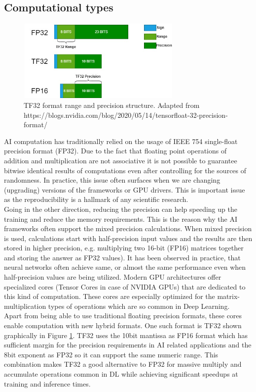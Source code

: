 \documentclass{article}
\begin{document}
\subsection{Computational types}
\begin{figure}[t!]
    \centering
    \includegraphics[width=8cm,height=4cm]{tf32.jpg}
    \caption{TF32 format range and precision structure. Adapted from  \\  https://blogs.nvidia.com/blog/2020/05/14/tensorfloat-32-precision-format/}
    \label{fig:tf32}
\end{figure}
AI computation has traditionally relied on the usage of IEEE 754 single-float precision format (FP32).
Due to the fact that floating point operations of addition and multiplication are not associative it is not possible to guarantee bitwise identical results of computations even after controlling for the sources of randomness.
In practice, this issue often surfaces when we are changing (upgrading) versions of the frameworks or GPU drivers.
This is important issue as the reproducibility is a hallmark of any scientific research.\\
Going in the other direction, reducing the precision can help speeding up the training and reduce the memory requirements.
This is the reason why the AI frameworks often support the mixed precision calculations.
When mixed precision is used, calculations start with half-precision input values and the results are then stored in higher precision, e.g. multiplying two 16-bit (FP16) matrices together and storing the answer as FP32 values).
It has been observed in practice, that neural networks often achieve same, or almost the same performance even when half-precision values are being utilized.
Modern GPU architectures offer specialized cores (Tensor Cores in case of NVIDIA GPUs) that are dedicated to this kind of computation.
These cores are especially optimized for the matrix-multiplication types of operations which are so common in Deep Learning.\\
Apart from being able to use traditional floating precision formats, these cores enable computation with new hybrid formats.
One such format is TF32 shown graphically in Figure \ref{fig:tf32}.
TF32 uses the 10bit mantissa as FP16 format which has sufficient margin for the precision requirements in AI related applications and the 8bit exponent as FP32 so it can support the same numeric range.
This combination makes TF32 a good alternative to FP32 for massive multiply and accumulate operations common in DL while achieving significant speedups at training and inference times.
\end{document}
